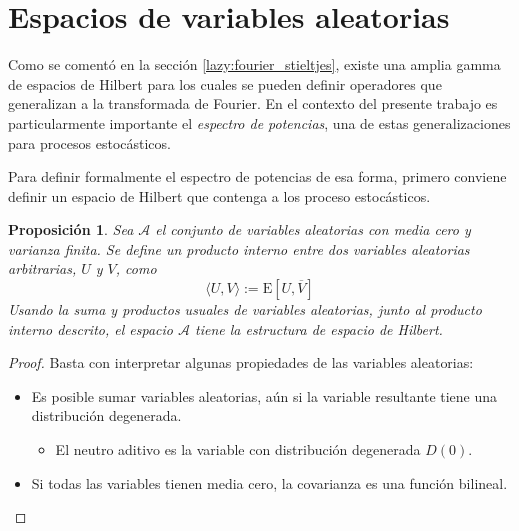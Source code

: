 \documentclass[12pt,letterpaper]{book}
\newtheorem{proposicion}[teorema]{Proposición}
\newcommand{\E}[1]{\mathrm{E}\left[ #1 \right]}
\begin{document}
%


\section{Espacios de variables aleatorias}

Como se comentó en la sección \ref{lazy:fourier_stieltjes}, existe una amplia gamma de espacios de Hilbert para los cuales se pueden definir operadores que generalizan a la transformada de Fourier.
%
En el contexto del presente trabajo es particularmente importante el \textit{espectro de potencias}, una de estas generalizaciones para procesos estocásticos.

Para definir formalmente el espectro de potencias de esa forma, primero conviene definir un espacio de Hilbert que contenga a los proceso estocásticos.

\begin{proposicion}
Sea $\mathcal{A}$ el conjunto de variables aleatorias con media cero y varianza finita. Se define un producto interno entre dos variables aleatorias arbitrarias, $U$ y $V$, como
\begin{equation}
\langle U , V \rangle := \E{U, \overline{V}}
\end{equation}
Usando la suma y productos usuales de variables aleatorias, junto al producto interno descrito, el espacio $\mathcal{A}$ tiene la estructura de espacio de Hilbert.
\end{proposicion}

\begin{proof}
Basta con interpretar algunas propiedades de las variables aleatorias:
\begin{itemize}
\item Es posible sumar variables aleatorias, aún si la variable resultante tiene una distribución degenerada.
\begin{itemize}
\item El neutro aditivo es la variable con distribución degenerada $D(0)$.
\end{itemize}
\item Si todas las variables tienen media cero, la covarianza es una función bilineal.
\end{itemize}
\end{proof}
\end{document}
